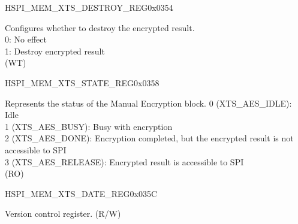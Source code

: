 \begin{register}{H}{SPI\_MEM\_XTS\_DESTROY\_REG}{0x0354}\label{regdesc:SPIMEMXTSDESTROYREG}
%
%
\regnewline%
\begin{regdesc}\begin{reglist}
\label{fielddesc:SPIMEMXTSDESTROY}\item [SPI\_MEM\_XTS\_DESTROY] Configures whether to destroy the encrypted result. \\
0: No effect\\
1: Destroy encrypted result\\
(WT)
\end{reglist}\end{regdesc}
\end{register}


\begin{register}{H}{SPI\_MEM\_XTS\_STATE\_REG}{0x0358}\label{regdesc:SPIMEMXTSSTATEREG}
%
%
\regnewline%
\begin{regdesc}\begin{reglist}
\label{fielddesc:SPIMEMXTSSTATE}\item [SPI\_MEM\_XTS\_STATE] Represents the status of the Manual Encryption block.
0 (XTS\_AES\_IDLE): Idle\\
1 (XTS\_AES\_BUSY): Busy with encryption\\
2 (XTS\_AES\_DONE): Encryption completed, but the encrypted result is not accessible to SPI\\
3 (XTS\_AES\_RELEASE): Encrypted result is accessible to SPI\\
(RO)
\end{reglist}\end{regdesc}
\end{register}


\begin{register}{H}{SPI\_MEM\_XTS\_DATE\_REG}{0x035C}\label{regdesc:SPIMEMXTSDATEREG}
%
%
\regnewline%
\begin{regdesc}\begin{reglist}
\label{fielddesc:SPIMEMXTSDATE}\item [SPI\_MEM\_XTS\_DATE] Version control register. (R/W)
\end{reglist}\end{regdesc}
\end{register}


